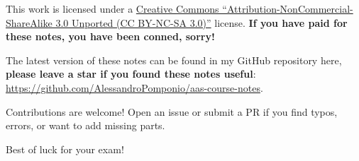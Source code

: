This work is licensed under a \href{https://creativecommons.org/licenses/by-nc-sa/3.0/}{Creative Commons ``Attribution-NonCommercial-ShareAlike 3.0 Unported (CC BY-NC-SA 3.0)''} license. \textbf{If you have paid for these notes, you have been conned, sorry!}

The latest version of these notes can be found in my GitHub repository here, \textbf{please leave a star if you found these notes useful}: \url{https://github.com/AlessandroPomponio/aas-course-notes}.

Contributions are welcome! Open an issue or submit a PR if you find typos, errors, or want to add missing parts.

Best of luck for your exam!

\cleardoublepage













\clearpage
\printbibliography


